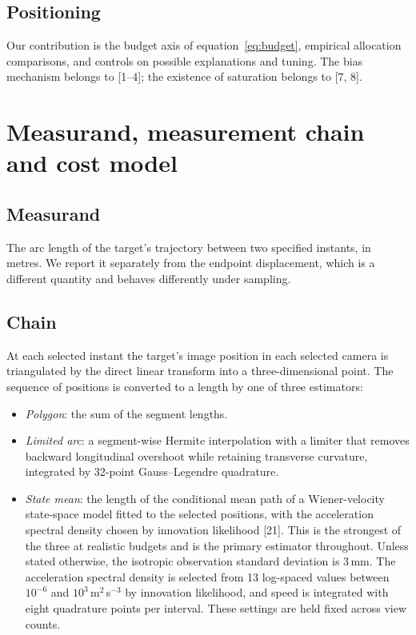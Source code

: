 \documentclass{iopjournal}
\begin{document}
\subsection{Positioning}
Our contribution is the budget axis of equation~\eqref{eq:budget}, empirical
allocation comparisons, and controls on possible explanations and tuning. The bias mechanism
belongs to [1--4]; the existence of saturation belongs to [7, 8].

\section{Measurand, measurement chain and cost model}
\label{sec:chain}

\subsection{Measurand}
The arc length of the target's trajectory between two specified instants, in
metres. We report it separately from the endpoint displacement, which is a
different quantity and behaves differently under sampling.

\subsection{Chain}
At each selected instant the target's image position in each selected camera
is triangulated by the direct linear transform into a three-dimensional point.
The sequence of positions is converted to a length by one of three estimators:

\begin{itemize}
\item \textit{Polygon}: the sum of the segment lengths.
\item \textit{Limited arc}: a segment-wise Hermite interpolation with a
limiter that removes backward longitudinal overshoot while retaining
transverse curvature, integrated by 32-point Gauss--Legendre quadrature.
\item \textit{State mean}: the length of the conditional mean path of a
Wiener-velocity state-space model fitted to the selected positions, with the
acceleration spectral density chosen by innovation likelihood [21]. This is
the strongest of the three at realistic budgets and is the primary estimator
throughout. Unless stated otherwise, the isotropic observation standard
deviation is 3\,mm. The acceleration spectral density is selected from 13
log-spaced values between $10^{-6}$ and $10^{3}$\,m$^{2}$\,s$^{-3}$ by
innovation likelihood, and speed is integrated with eight quadrature points
per interval. These settings are held fixed across view counts.
\end{itemize}
\end{document}
